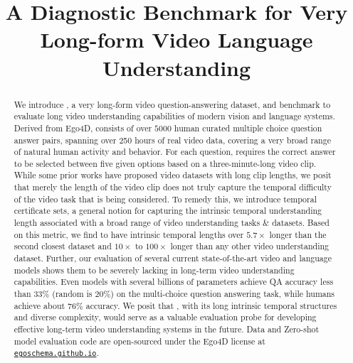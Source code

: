 \title{A Diagnostic Benchmark for Very Long-form Video Language Understanding}



\maketitle
\begin{abstract}
We introduce \name{}{}, a very long-form video question-answering dataset, and benchmark to evaluate long video understanding capabilities of modern vision and language systems. 
Derived from Ego4D, \name{}{} consists of over $5000$ human curated multiple choice question answer pairs, spanning over 250 hours of real video data, covering a very broad range of natural human activity and behavior. 
For each question, \name{}{} requires the correct answer to be selected between five given options based on a three-minute-long video clip. 
While some prior works have proposed video datasets with long clip lengths, we posit that merely the length of the video clip does not truly capture the temporal difficulty of the video task that is being considered.
To remedy this, we introduce temporal certificate sets, a general notion for capturing the intrinsic temporal understanding length associated with a broad range of video understanding tasks \& datasets. 
Based on this metric, we find \name{}{} to have intrinsic temporal lengths over $5.7\times$ longer than the second closest dataset and $10\times$ to $100\times$ longer than any other video understanding dataset. 
Further, our evaluation of several current state-of-the-art video and language models shows them to be severely lacking in long-term video understanding capabilities. Even models with several billions of parameters achieve QA accuracy less than 33\% (random is 20\%) on the \name{}{} multi-choice question answering task, while humans achieve about 76\% accuracy.   
We posit that \name{}{}, with its long intrinsic temporal structures and diverse complexity, would serve as a valuable evaluation probe for developing effective long-term video understanding systems in the future.  
Data and Zero-shot model evaluation code are open-sourced under the Ego4D license at \href{http://egoschema.github.io}{\texttt{egoschema.github.io}}.  
\end{abstract}

